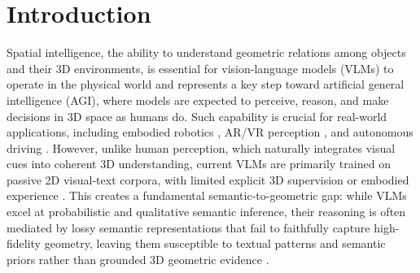 \documentclass{llmxive}
\begin{document}
\vspace{3mm}




\section{Introduction}
\label{sec:intro}
Spatial intelligence, the ability to understand geometric relations among objects and their 3D environments, is essential for vision-language models (VLMs) to operate in the physical world and represents a key step toward artificial general intelligence (AGI), where models are expected to perceive, reason, and make decisions in 3D space as humans do. 
% 
Such capability is crucial for real-world applications, including embodied robotics \citep{driess2023palme,brohan2023rt2}, AR/VR perception \citep{newcombe2011kinectfusion}, and autonomous driving \citep{geiger2012kitti,caesar2020nuscenes}. 
% 
However, unlike human perception, which naturally integrates visual cues into coherent 3D understanding, current VLMs are primarily trained on passive 2D visual-text corpora, with limited explicit 3D supervision or embodied experience \citep{radford2021clip,alayrac2022flamingo,liu2023llava}.
% 
This creates a fundamental semantic-to-geometric gap: while VLMs excel at probabilistic and qualitative semantic inference, their reasoning is often mediated by lossy semantic representations that fail to faithfully capture high-fidelity geometry, leaving them susceptible to textual patterns and semantic priors rather than grounded 3D geometric evidence \citep{gca,testset_stress}.
\end{document}
